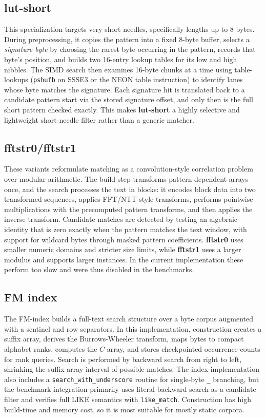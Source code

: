 \documentclass[11pt]{article}
\begin{document}
\subsection{lut-short}
This specialization targets very short needles, specifically lengths up to 8 bytes. During preprocessing, it copies the pattern into a fixed 8-byte buffer, selects a \emph{signature byte} by choosing the rarest byte occurring in the pattern, records that byte’s position, and builds two 16-entry lookup tables for its low and high nibbles. The SIMD search then examines 16-byte chunks at a time using table-lookups (\verb|pshufb| on SSSE3 or the NEON table instruction) to identify lanes whose byte matches the signature. Each signature hit is translated back to a candidate pattern start via the stored signature offset, and only then is the full short pattern checked exactly. This makes \textbf{lut-short} a highly selective and lightweight short-needle filter rather than a generic matcher. 

\subsection{fftstr0/fftstr1}
These variants reformulate matching as a convolution-style correlation problem over modular arithmetic. The build step transforms pattern-dependent arrays once, and the search processes the text in blocks: it encodes block data into two transformed sequences, applies FFT/NTT-style transforms, performs pointwise multiplications with the precomputed pattern transforms, and then applies the inverse transform. Candidate matches are detected by testing an algebraic identity that is zero exactly when the pattern matches the text window, with support for wildcard bytes through masked pattern coefficients. \textbf{fftstr0} uses smaller numeric domains and stricter size limits, while \textbf{fftstr1} uses a larger modulus and supports larger instances. In the current implementation these perform too slow and were thus disabled in the benchmarks.

\subsection{FM index}
The FM-index builds a full-text search structure over a byte corpus augmented with a sentinel and row separators. In this implementation, construction creates a suffix array, derives the Burrows-Wheeler transform, maps bytes to compact alphabet ranks, computes the \(C\) array, and stores checkpointed occurrence counts for rank queries. Search is performed by backward search from right to left, shrinking the suffix-array interval of possible matches. The index implementation also includes a \texttt{search\_with\_underscore} routine for single-byte \texttt{\_} branching, but the benchmark integration primarily uses literal backward search as a candidate filter and verifies full LIKE semantics with \texttt{like\_match}. Construction has high build-time and memory cost, so it is most suitable for mostly static corpora.
\end{document}
